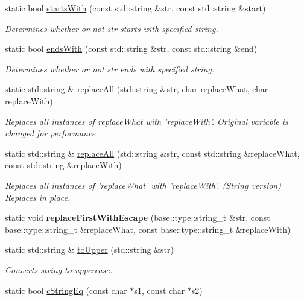 \begin{DoxyCompactItemize}
\item 
static bool \hyperlink{classel_1_1base_1_1utils_1_1Str_acf80221cec72da701ef50995a61ab91f}{starts\-With} (const std\-::string \&str, const std\-::string \&start)
\begin{DoxyCompactList}\small\item\em Determines whether or not str starts with specified string. \end{DoxyCompactList}\item 
static bool \hyperlink{classel_1_1base_1_1utils_1_1Str_a5bcf5f6cc41a7ed683be115148579561}{ends\-With} (const std\-::string \&str, const std\-::string \&end)
\begin{DoxyCompactList}\small\item\em Determines whether or not str ends with specified string. \end{DoxyCompactList}\item 
static std\-::string \& \hyperlink{classel_1_1base_1_1utils_1_1Str_aa07bfda259ed194120b371401734ae86}{replace\-All} (std\-::string \&str, char replace\-What, char replace\-With)
\begin{DoxyCompactList}\small\item\em Replaces all instances of replace\-What with 'replace\-With'. Original variable is changed for performance. \end{DoxyCompactList}\item 
static std\-::string \& \hyperlink{classel_1_1base_1_1utils_1_1Str_a8e823aa60b160451ca0b8732c3c75568}{replace\-All} (std\-::string \&str, const std\-::string \&replace\-What, const std\-::string \&replace\-With)
\begin{DoxyCompactList}\small\item\em Replaces all instances of 'replace\-What' with 'replace\-With'. (String version) Replaces in place. \end{DoxyCompactList}\item 
\hypertarget{classel_1_1base_1_1utils_1_1Str_a3725349f601d07316d1c2bc211daaaa1}{static void {\bfseries replace\-First\-With\-Escape} (base\-::type\-::string\-\_\-t \&str, const base\-::type\-::string\-\_\-t \&replace\-What, const base\-::type\-::string\-\_\-t \&replace\-With)}\label{classel_1_1base_1_1utils_1_1Str_a3725349f601d07316d1c2bc211daaaa1}

\item 
static std\-::string \& \hyperlink{classel_1_1base_1_1utils_1_1Str_a6a05315fb967508dc1faf0584421a95d}{to\-Upper} (std\-::string \&str)
\begin{DoxyCompactList}\small\item\em Converts string to uppercase. \end{DoxyCompactList}\item 
\hypertarget{classel_1_1base_1_1utils_1_1Str_a8081458c7848ff991d765c69f7858c44}{static bool \hyperlink{classel_1_1base_1_1utils_1_1Str_a8081458c7848ff991d765c69f7858c44}{c\-String\-Eq} (const char $\ast$s1, const char $\ast$s2)}\label{classel_1_1base_1_1utils_1_1Str_a8081458c7848ff991d765c69f7858c44}


\end{DoxyCompactItemize}
